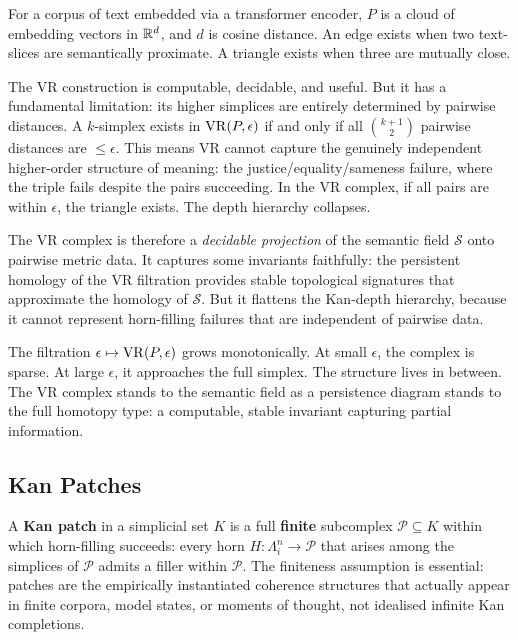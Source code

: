 For a corpus of text embedded via a transformer encoder, $P$ is a cloud of embedding vectors in $\mathbb{R}^d$, and $d$ is cosine distance. An edge exists when two text-slices are semantically proximate. A triangle exists when three are mutually close.

The VR construction is computable, decidable, and useful. But it has a fundamental limitation: its higher simplices are entirely determined by pairwise distances. A $k$-simplex exists in $\mathrm{VR}(P, \epsilon)$ if and only if all $\binom{k+1}{2}$ pairwise distances are $\leq \epsilon$. This means VR cannot capture the genuinely independent higher-order structure of meaning: the justice/equality/sameness failure, where the triple fails despite the pairs succeeding. In the VR complex, if all pairs are within $\epsilon$, the triangle exists. The depth hierarchy collapses.

The VR complex is therefore a \emph{decidable projection} of the semantic field $\mathcal{S}$ onto pairwise metric data. It captures some invariants faithfully: the persistent homology of the VR filtration provides stable topological signatures \cite{cohen2007stability} that approximate the homology of $\mathcal{S}$. But it flattens the Kan-depth hierarchy, because it cannot represent horn-filling failures that are independent of pairwise data.

The filtration $\epsilon \mapsto \mathrm{VR}(P, \epsilon)$ grows monotonically. At small $\epsilon$, the complex is sparse. At large $\epsilon$, it approaches the full simplex. The structure lives in between. The VR complex stands to the semantic field as a persistence diagram stands to the full homotopy type: a computable, stable invariant capturing partial information.


\subsection{Kan Patches}

\begin{definition}
\label{def:kan-patch}
A \textbf{Kan patch} in a simplicial set $K$ is a full \textbf{finite} subcomplex $\mathcal{P} \subseteq K$ within which horn-filling succeeds: every horn $H : \Lambda^n_i \to \mathcal{P}$ that arises among the simplices of $\mathcal{P}$ admits a filler within $\mathcal{P}$. The finiteness assumption is essential: patches are the empirically instantiated coherence structures that actually appear in finite corpora, model states, or moments of thought, not idealised infinite Kan completions.
\end{definition}

